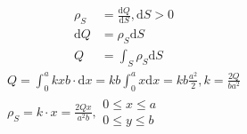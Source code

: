 \begin{figure}[h]
    \centering
    
\end{figure}
\begin{align*}
    \rho_S &= \frac{\mathrm dQ}{\mathrm dS}, \mathrm dS > 0\\
    \mathrm dQ &= \rho_S\mathrm dS\\
    Q &= \int_S\rho_S\mathrm dS
\end{align*}
\begin{align*}
    Q = \int_0^a kxb\cdot \mathrm dx = kb\int_0^a x\mathrm dx = kb\frac{a^2}{2}, k = \frac{2Q}{ba^2}\\
    \boxed{\rho_S = k\cdot x = \frac{2Qx}{a^2 b}, \begin{array}{c}
         0 \leq x \leq a \\
         0 \leq y \leq b 
    \end{array}}    
\end{align*}